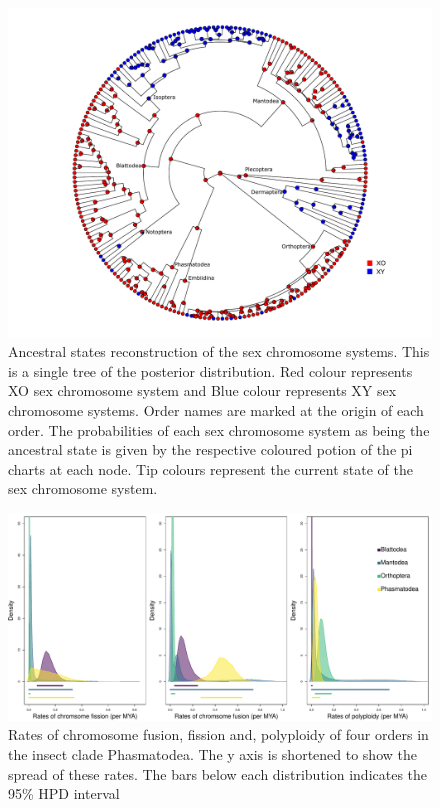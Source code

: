 \newpage
\begin{figure}
\centering \includegraphics[width=1\textwidth]{figures/sex_chrom_asr_phylogeny.pdf}
\caption{Ancestral states reconstruction of the sex chromosome systems. This is a single tree of the posterior distribution. Red colour represents XO sex chromosome system and Blue colour represents XY sex chromosome systems. Order names are marked at the origin of each order. The probabilities of each sex chromosome system as being the ancestral state is given by the respective coloured potion of the pi charts at each node. Tip colours represent the current state of the sex chromosome system.}
\label{fig:sex.asr.plot}
\end{figure}

\newpage
\begin{figure}
\centering \includegraphics[width=.7\textwidth]{figures/order_rates_95HPD.pdf}
\caption{Rates of chromosome fusion, fission and, polyploidy of four orders in the insect clade Phasmatodea. The y axis is shortened to show the spread of these rates. The bars below each distribution indicates the 95\% HPD interval}
\label{fig:order.rates.95HPD}
\end{figure}

